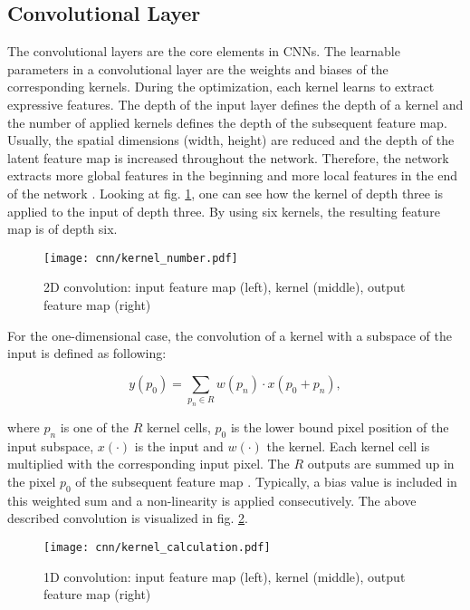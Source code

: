 \subsection{Convolutional Layer}
The convolutional layers are the core elements in CNNs. The learnable parameters in a convolutional layer are the weights and biases of the corresponding kernels. During the optimization, each kernel learns to extract expressive features. The depth of the input layer defines the depth of a kernel and the number of applied kernels defines the depth of the subsequent feature map. Usually, the spatial dimensions (width, height) are reduced and the depth of the latent feature map is increased throughout the network. Therefore, the network extracts more global features in the beginning and more local features in the end of the network \cite{OShea2015}. Looking at fig. \ref{fig:kernel_number}, one can see how the kernel of depth three is applied to the input of depth three. By using six kernels, the resulting feature map is of depth six.

\begin{figure}[H]
  \centering
  \texttt{[image: cnn/kernel\_number.pdf]}
  \caption {2D convolution: input feature map (left), kernel (middle), output feature map (right)}
  \label{fig:kernel_number}
\end{figure}

For the one-dimensional case, the convolution of a kernel with a subspace of the input is defined as following:

\begin{equation}
  y(p_{0}) = \sum_{p_{n} \in R} w(p_{n}) \cdot x(p_{0} + p_{n}), 
  \label{eq:kernel}
\end{equation}

where $p_{n}$ is one of the $R$ kernel cells, $p_{0}$ is the lower bound pixel position of the input subspace, $x(\cdot)$ is the input and $w(\cdot)$ the kernel. Each kernel cell is multiplied with the corresponding input pixel. The $R$ outputs are summed up in the pixel $p_{0}$ of the subsequent feature map \cite{Dai2017}. Typically, a bias value is included in this weighted sum and a non-linearity is applied consecutively. The above described convolution is visualized in fig. \ref{fig:kernel}.

\begin{figure}[H]
  \centering
  \texttt{[image: cnn/kernel\_calculation.pdf]}
  \caption {1D convolution: input feature map (left), kernel (middle), output feature map (right)}
  \label{fig:kernel}
\end{figure}

